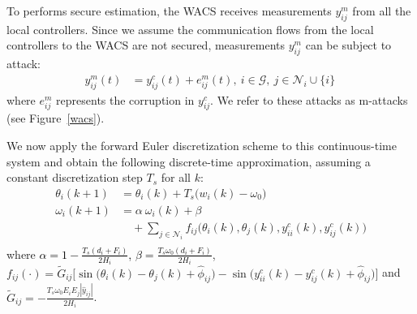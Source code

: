 To performs secure estimation, the WACS receives measurements $y^m_{ij}$ from all the local controllers. Since we assume the communication flows from the local controllers to the WACS are not secured, measurements $y^m_{ij}$ can be subject to attack:
\begin{equation}\label{Eq:ym}
\begin{aligned}
y^m_{ij}(t) &= y^c_{ij}(t) + e^m_{ij}(t),~i \in \mathcal{G},~j \in \mathcal{N}_i \cup \{i\} \,
\end{aligned}
\end{equation}
where $e^m_{ij}$ represents the corruption in $y^c_{ij}$. We refer to these attacks as m-attacks (see Figure~\ref{wacs}).

We now apply the forward Euler discretization scheme to this continuous-time system and obtain the following discrete-time approximation, assuming a constant discretization step $T_s$ for all $k$:
\begin{equation}
\begin{aligned}
\theta_i (k+1) &= \theta_i(k) + T_s \big(w_i(k) - \omega_0\big) \\
\omega_i(k+1)
	&= \alpha~\omega_i(k) + \beta \\
	& \quad + \sum_{j\in \mathcal{N}_i} f_{ij} \big(\theta_i(k), \theta_j(k), y^c_{ii}(k), y^c_{ij}(k)\big) \\
\end{aligned}
\end{equation}
where \textcolor{black}{$\alpha = 1- \frac{T_s (d_i + F_i)}{2H_i}$, $\beta = \frac{T_s  \omega_0(d_i+F_i)}{2H_i}$}, $f_{ij} (\cdot) = \tilde G_{ij} \big[ \sin \big(\theta_i(k) - \theta_j(k) + \widehat{\phi}_{ij}\big) - \sin \big(y^c_{ii}(k) - y^c_{ij}(k)+\widehat{\phi}_{ij}\big) \big] $
and $\tilde G_{ij} = - \frac{T_s \omega_0 E_i E_j |\widehat{y}_{ij}|}{2H_i}$.

